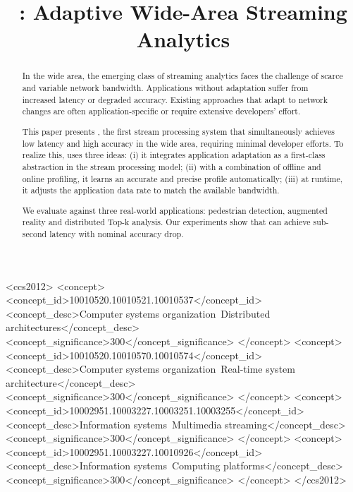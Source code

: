 \documentclass[10pt, sigplan, anonymous, review]{acmart}
\begin{document}
\title{\sysname{}: Adaptive Wide-Area Streaming Analytics}

\renewcommand{\shortauthors}{B. Zhang et al.}



\begin{abstract}
  In the wide area, the emerging class of streaming analytics faces the
  challenge of scarce and variable network bandwidth. Applications without
  adaptation suffer from increased latency or degraded accuracy. Existing
  approaches that adapt to network changes are often application-specific or
  require extensive developers' effort.

  This paper presents \sysname{}, the first stream processing system that
  simultaneously achieves low latency and high accuracy in the wide area,
  requiring minimal developer efforts. To realize this, \sysname{} uses three
  ideas: (i) it integrates application adaptation as a first-class abstraction
  in the stream processing model; (ii) with a combination of offline and online
  profiling, it learns an accurate and precise profile automatically; (iii) at
  runtime, it adjusts the application data rate to match the available
  bandwidth.

  We evaluate \sysname{} against three real-world applications: pedestrian
  detection, augmented reality and distributed Top-k analysis. Our experiments
  show that \sysname{} can achieve sub-second latency with nominal accuracy
  drop.
\end{abstract}

%
\begin{CCSXML}
<ccs2012>
  <concept>
    <concept_id>10010520.10010521.10010537</concept_id>
    <concept_desc>Computer systems organization~Distributed architectures</concept_desc>
    <concept_significance>300</concept_significance>
  </concept>
  <concept>
    <concept_id>10010520.10010570.10010574</concept_id>
    <concept_desc>Computer systems organization~Real-time system architecture</concept_desc>
    <concept_significance>300</concept_significance>
  </concept>
  <concept>
    <concept_id>10002951.10003227.10003251.10003255</concept_id>
    <concept_desc>Information systems~Multimedia streaming</concept_desc>
    <concept_significance>300</concept_significance>
  </concept>
  <concept>
    <concept_id>10002951.10003227.10010926</concept_id>
    <concept_desc>Information systems~Computing platforms</concept_desc>
    <concept_significance>300</concept_significance>
  </concept>
</ccs2012>
\end{CCSXML}
\end{document}
